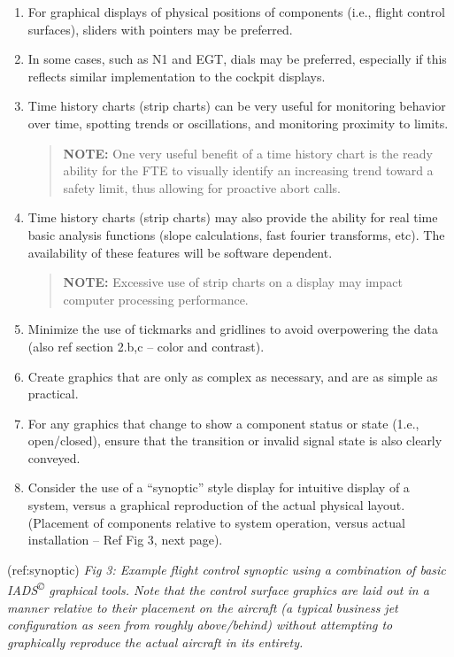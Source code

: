 \documentclass[
]{book}
\begin{document}
\begin{enumerate}
\begin{enumerate}
    \begin{enumerate}
    \def\labelenumiii{\arabic{enumiii}.}
    \setcounter{enumiii}{6}
    \item
      For graphical displays of physical positions of components (i.e., flight control surfaces), sliders with pointers may be preferred.
    \item
      In some cases, such as N1 and EGT, dials may be preferred, especially if this reflects similar implementation to the cockpit displays.
    \item
      Time history charts (strip charts) can be very useful for monitoring behavior over time, spotting trends or oscillations, and monitoring proximity to limits.

      \begin{quote}
      \textbf{NOTE:} One very useful benefit of a time history chart is the ready ability for the FTE to visually identify an increasing trend toward a safety limit, thus allowing for proactive abort calls.
      \end{quote}
    \item
      Time history charts (strip charts) may also provide the ability for real time basic analysis functions (slope calculations, fast fourier transforms, etc). The availability of these features will be software dependent.

      \begin{quote}
      \textbf{NOTE:} Excessive use of strip charts on a display may impact computer processing performance.
      \end{quote}
    \item
      Minimize the use of tickmarks and gridlines to avoid overpowering the data (also ref section 2.b,c -- color and contrast).
    \item
      Create graphics that are only as complex as necessary, and are as simple as practical.
    \item
      For any graphics that change to show a component status or state (1.e., open/closed), ensure that the transition or invalid signal state is also clearly conveyed.
    \item
      Consider the use of a ``synoptic'' style display for intuitive display of a system, versus a graphical reproduction of the actual physical layout. (Placement of components relative to system operation, versus actual installation -- Ref Fig 3, next page).
    \end{enumerate}

    (ref:synoptic) \emph{Fig 3: Example flight control synoptic using a combination of basic IADS\textsuperscript{©} graphical tools. Note that the control surface graphics are laid out in a manner relative to their placement on the aircraft (a typical business jet configuration as seen from roughly above/behind) without attempting to graphically reproduce the actual aircraft in its entirety.}


\end{enumerate}
\end{enumerate}
\end{document}
